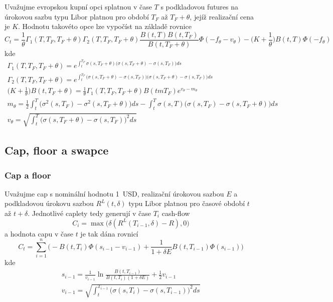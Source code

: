\documentclass[a4paper]{book}
\begin{document}
Uvažujme evropskou kupní opci splatnou v čase $T$ s podkladovou futures na úrokovou sazbu typu Libor platnou pro období $T_F$ až $T_F + \theta$, jejíž realizační cena je $K$. Hodnotu takovéto opce lze vypočíst na základě rovnice
\begin{equation*}
C_t = \frac{1}{\theta} \Gamma_1(T, T_F, T_F + \theta) \Gamma_2(T, T_F, T_F + \theta) \frac{B(t,T)B(t, T_F)}{B(t, T_F + \theta)}\Phi(-f_{\theta} - v_{\theta}) - \Big( K + \frac{1}{\theta} \Big)B(t, T)\Phi(-f_{\theta}) 
\end{equation*}
kde
\begin{gather*}
\Gamma_1(T, T_F, T_F + \theta) = e^{\int_t^{T_F} \sigma(s, T_F + \theta)\big( \sigma(s, T_F + \theta) - \sigma(s, T_F)\big)ds}\\
\Gamma_2(T, T_F, T_F + \theta) = e^{\int_t^{T_F} \big(\sigma(s, T_F + \theta) - \sigma(s, T_F) \big)\big( \sigma(s, T_F + \theta) - \sigma(s, T_F)\big)ds}\\
\Big( K + \frac{1}{\theta}\Big)B(t, T_F + \theta) = \frac{1}{\theta} \Gamma_1(T, T_F, T_F + \theta)B(tm T_F)e^{v_{\theta} - m_{\theta}}\\
m_{\theta} = \frac{1}{2}\int_t^T \big( \sigma^2(s, T_F) - \sigma^2(s, T_F + \theta) \big)ds - \int_t^T \sigma(s,T)\big( \sigma(s, T_F) - \sigma(s, T_F + \theta)\big)ds\\
v_{\theta} = \sqrt{\int_t^T\big( \sigma(s, T_F + \theta) - \sigma(s, T_F)\big)^2 ds}
\end{gather*}

\subsection{Cap, floor a swapce}

\subsubsection{Cap a floor}

Uvažujme cap s nominální hodnotu 1~USD, realizační úrokovou sazbou $E$ a podkladovou úrokovu sazbou $R^L(t, \delta)$ typu Libor platnou pro časové období $t$ až $t + \delta$. Jednotlivé caplety tedy generují v čase $T_i$ cash-flow
\begin{equation*}
C_i = \max\big( \delta(R^L(T_{i-1}, \delta) - R), 0\big)
\end{equation*}
a hodnota capu v čase $t$ je tak dána rovnicí
\begin{equation*}
C_t = \sum_{i=1}^n \Bigg( -B(t, T_i) \Phi(s_{i-1} - v_{i-1}) + \frac{1}{1 + \delta E}B(t, T_{i-1})\Phi(s_{i-1})\Bigg)
\end{equation*}
kde
\begin{gather*}
s_{i-1} = \frac{1}{v_{i-1}}\ln \frac{B(t, T_{i-1})}{B(t, T_i)(1 + \delta E)} + \frac{1}{2}v_{i-1}\\
v_{i-1} = \sqrt{\int_t^{T_{i-1}}\big( \sigma(s, T_i) - \sigma(s, T_{i-1})\big)^2 ds}
\end{gather*}
\end{document}
